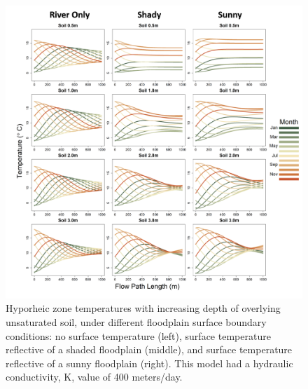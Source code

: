 \documentclass[letterpaper, 11pt]{article}
\begin{document}
\begin{figure}
    \centering
    \includegraphics{Figures/compare_thickness_and_shade_k_400_w_riveronly_finalized.png}
    \caption{Hyporheic zone temperatures with increasing depth of overlying unsaturated soil, under different floodplain surface boundary conditions: no surface temperature (left), surface temperature reflective of a shaded floodplain (middle), and surface temperature reflective of a sunny floodplain (right). This model had a hydraulic conductivity, K, value of 400 meters/day.}
    \label{fig:thicknessK400}
\end{figure}
\end{document}
